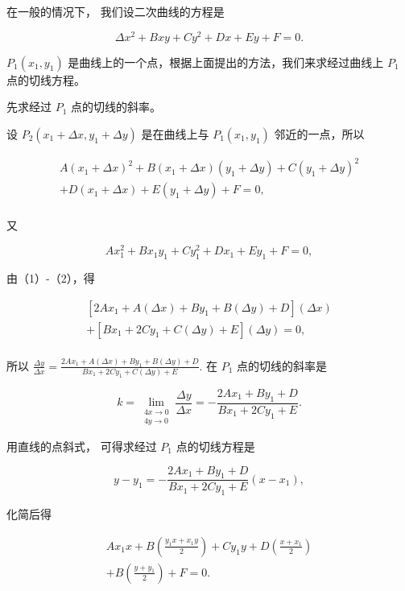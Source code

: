 在一般的情况下， 我们设二次曲线的方程是

\[
\Delta x^{2} + B x y + C y^{2} + D x + E y + F = 0.
\]

\(P_{1}(x_{1},y_{1})\)
是曲线上的一个点，根据上面提出的方法，我们来求经过曲线上 \(P_{1}\)
点的切线方程。

先求经过 \(P_{1}\) 点的切线的斜率。

设 \(P_{2}(x_{1} + \Delta x, y_{1} + \Delta y)\) 是在曲线上与
\(P_{1}(x_{1}, y_{1})\) 邻近的一点，所以

\[
\begin{array}{l} A \left(x_{1} + \Delta x\right) ^ {2} + B \left(x_{1} + \Delta x\right) \left(y_{1} + \Delta y\right) + C \left(y_{1} + \Delta y\right) ^ {2} \\ + D \left(x_{1} + \Delta x\right) + E \left(y_{1} + \Delta y\right) + F = 0, \tag {1} \\ \end{array}
\]

又

\[
A x_{1} ^ {2} + B x_{1} y_{1} + C y_{1} ^ {2} + D x_{1} + E y_{1} + F = 0, \tag {2}
\]

由（1）-（2），得

\[
\begin{array}{l} [ 2 A x_{1} + A (\Delta x) + B y_{1} + B (\Delta y) + D ] (\Delta x) \\ + [ B x_{1} + 2 C y_{1} + C (\Delta y) + E ] (\Delta y) = 0, \\ \end{array}
\]

所以
\(\frac{\Delta y}{\Delta x} = \frac{2Ax_1 + A(\Delta x) + By_1 + B(\Delta y) + D}{Bx_1 + 2Cy_1 + C(\Delta y) + E}.\)
在 \(P_{1}\) 点的切线的斜率是

\[
k = \lim _ {\substack {4 x \rightarrow 0 \\ 4 y \rightarrow 0}} \frac {\Delta y}{\Delta x} = - \frac {2 A x_{1} + B y_{1} + D}{B x_{1} + 2 C y_{1} + E}.
\]

用直线的点斜式， 可得求经过 \(P_{1}\) 点的切线方程是

\[
y - y_{1} = - \frac {2 A x_{1} + B y_{1} + D}{B x_{1} + 2 C y_{1} + E} (x - x_{1}),
\]

化简后得

\[
\begin{array}{l} A x_{1} x + B \left(\frac {y_{1} x + x_{1} y}{2}\right) + C y_{1} y + D \left(\frac {x + x_{1}}{2}\right) \\ + B \left(\frac {y + y_{1}}{2}\right) + F = 0. \\ \end{array}
\]

